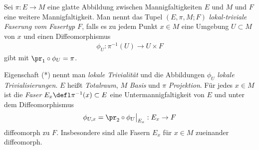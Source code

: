 \documentclass[%
	paper=a5,%
	fleqn,%
	DIV=18,%
	BCOR=0mm,
	fontsize=11pt,
	titlepage=false,%
	bibliography=totoc,
	DIV=18,%
	twoside=true,
	pdftitle=Riemannsche Geometrie,
	pdfauthor=Uwe Semmelmann,
	numbers=noendperiod]%
	{scrbook}
\begin{document}
\begin{defn}
Sei $\pi: E\to M$ eine glatte Abbildung zwischen Mannigfaltigkeiten $E$ und $M$
und $F$ eine weitere Mannigfaltigkeit. Man nennt das Tupel $(E,\pi,M;F)$
\emph{lokal-triviale Faserung vom Fasertyp $F$}, falls es zu jedem Punkt $x\in
M$ eine Umgebung $U\subset M$ von $x$ und einen Diffeomorphismus
\begin{align*}
\phi_U : \pi^{-1}(U)\to U\times F\tag{*}
\end{align*}
gibt mit $\pr_1\circ\phi_U = \pi$.\fish
\end{defn}


Eigenschaft (*) nennt man \emph{lokale Trivialität} und die Abbildungen
$\phi_U$ \emph{lokale Trivialisierungen}. $E$ heißt \emph{Totalraum}, $M$
\emph{Basis} und $\pi$ \emph{Projektion}.
Für jedes $x\in M$ ist die \emph{Faser} $E_x \defl \pi^{-1}(x) \subset E$
eine Untermannigfaltigkeit von $E$ und unter dem Diffeomorphismus
\begin{align*}
\phi_{U,x} = \pr_2\circ\phi_U\big|_{E_x} : E_x\to F
\end{align*}
diffeomorph zu $F$. Insbesondere sind alle Fasern $E_x$ für $x\in M$ zueinander
diffeomorph.
\end{document}

